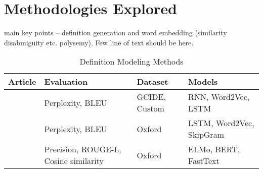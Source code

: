 \section{Methodologies Explored}
main key points -- definition generation and word embedding (similarity disabmiguity etc. polysemy). Few line of text should be here.  

\begin{longtable}{|p{3.5cm}|p{3.5cm}|p{3.5cm}|p{3.5cm}|}
    \caption{Definition Modeling Methods}                                                                                                                                                                                                                                                                                                                                                   \\
    \hline
    Article                                                                                                                   & Evaluation                                                       & Dataset                                                                                                                                       & Models                                   \\
    \hline
    \citeauthor*{noraset_definition_2016} \citeyear{noraset_definition_2016} \cite{noraset_definition_2016}                   & Perplexity, BLEU                                                 & GCIDE, Custom                                                                                                                                 & RNN, Word2Vec, LSTM                      \\
    \hline
    \citeauthor*{gadetsky_conditional_2018} \citeyear{gadetsky_conditional_2018} \cite{gadetsky_conditional_2018}             & Perplexity, BLEU                                                 & Oxford                                                                                                                                        & LSTM, Word2Vec, SkipGram                 \\
    \hline
    \citeauthor*{chang_what_2019} \citeyear{chang_what_2019} \cite{chang_what_2019}                                           & Precision, ROUGE-L, Cosine similarity                            & Oxford                                                                                                                                        & ELMo, BERT, FastText                     \\

\end{longtable}

